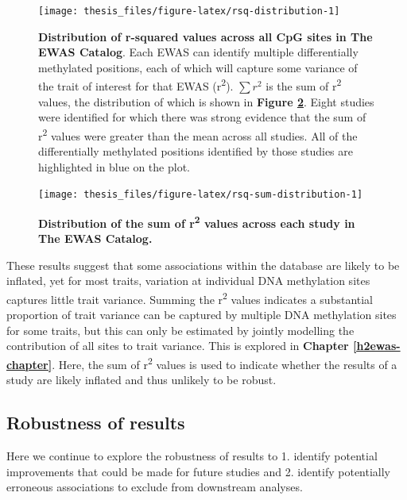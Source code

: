 \documentclass[11pt,oneside]{bristolthesis}
\begin{document}
\begin{figure}

{\centering \texttt{[image: thesis\_files/figure-latex/rsq-distribution-1]} 

}

\caption{\textbf{Distribution of r-squared values across all CpG sites in The EWAS Catalog}. Each EWAS can identify multiple differentially methylated positions, each of which will capture some variance of the trait of interest for that EWAS (r\textsuperscript{2}). \(\sum {r^2}\) is the sum of r\textsuperscript{2} values, the distribution of which is shown in \textbf{Figure \ref{fig:rsq-sum-distribution}}. Eight studies were identified for which there was strong evidence that the sum of r\textsuperscript{2} values were greater than the mean across all studies. All of the differentially methylated positions identified by those studies are highlighted in blue on the plot.}\label{fig:rsq-distribution}
\end{figure}

\begin{figure}

{\centering \texttt{[image: thesis\_files/figure-latex/rsq-sum-distribution-1]} 

}

\caption{\textbf{Distribution of the sum of r\textsuperscript{2} values across each study in The EWAS Catalog.}}\label{fig:rsq-sum-distribution}
\end{figure}
These results suggest that some associations within the database are likely to be inflated, yet for most traits, variation at individual DNA methylation sites captures little trait variance. Summing the r\textsuperscript{2} values indicates a substantial proportion of trait variance can be captured by multiple DNA methylation sites for some traits, but this can only be estimated by jointly modelling the contribution of all sites to trait variance. This is explored in \textbf{Chapter \ref{h2ewas-chapter}}. Here, the sum of r\textsuperscript{2} values is used to indicate whether the results of a study are likely inflated and thus unlikely to be robust.

\hypertarget{robustness-of-results}{%
\subsection{Robustness of results}\label{robustness-of-results}}

Here we continue to explore the robustness of results to 1. identify potential improvements that could be made for future studies and 2. identify potentially erroneous associations to exclude from downstream analyses.
\end{document}
